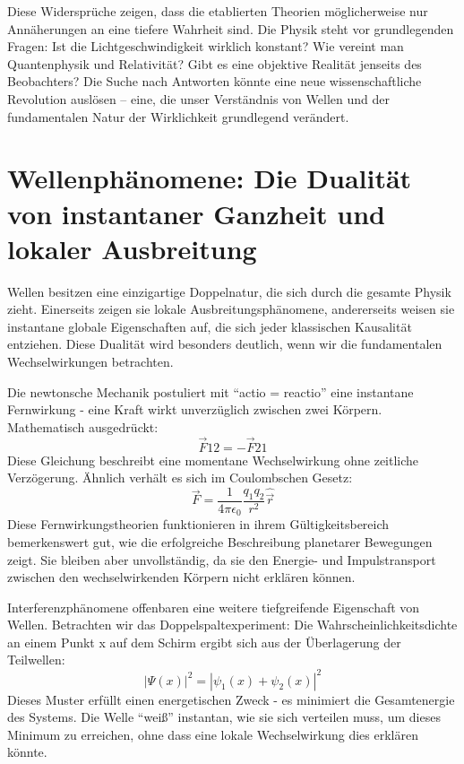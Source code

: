 Diese Widersprüche zeigen, dass die etablierten Theorien möglicherweise nur Annäherungen an eine tiefere Wahrheit sind. Die Physik steht vor grundlegenden Fragen: Ist die Lichtgeschwindigkeit
wirklich konstant? Wie vereint man Quantenphysik und Relativität? Gibt es eine objektive Realität jenseits des Beobachters? Die Suche nach Antworten könnte eine neue wissenschaftliche
Revolution auslösen – eine, die unser Verständnis von Wellen und der fundamentalen Natur der Wirklichkeit grundlegend verändert.

\section{Wellenphänomene: Die Dualität von instantaner Ganzheit und lokaler Ausbreitung}
Wellen besitzen eine einzigartige Doppelnatur, die sich durch die gesamte Physik zieht. Einerseits zeigen sie lokale Ausbreitungsphänomene, andererseits weisen sie instantane globale
Eigenschaften auf, die sich jeder klassischen Kausalität entziehen. Diese Dualität wird besonders deutlich, wenn wir die fundamentalen Wechselwirkungen betrachten.

Die newtonsche Mechanik postuliert mit \enquote{actio = reactio} eine instantane Fernwirkung - eine Kraft wirkt unverzüglich zwischen zwei Körpern. Mathematisch ausgedrückt:
\begin{equation}
    \vec{F}{12} = -\vec{F}{21}
\end{equation}
Diese Gleichung beschreibt eine momentane Wechselwirkung ohne zeitliche Verzögerung. Ähnlich verhält es sich im Coulombschen Gesetz:
\begin{equation}
    \vec{F} = \frac{1}{4\pi\epsilon_0}\frac{q_1q_2}{r^2}\hat{\vec{r}}
\end{equation}
Diese Fernwirkungstheorien funktionieren in ihrem Gültigkeitsbereich bemerkenswert gut, wie die erfolgreiche Beschreibung planetarer Bewegungen zeigt. Sie bleiben aber unvollständig,
da sie den Energie- und Impulstransport zwischen den wechselwirkenden Körpern nicht erklären können.

Interferenzphänomene offenbaren eine weitere tiefgreifende Eigenschaft von Wellen. Betrachten wir das Doppelspaltexperiment: Die Wahrscheinlichkeitsdichte an einem Punkt x auf dem
Schirm ergibt sich aus der Überlagerung der Teilwellen:
\begin{equation}
    |\Psi(x)|^2 = |\psi_1(x) + \psi_2(x)|^2
\end{equation}
Dieses Muster erfüllt einen energetischen Zweck - es minimiert die Gesamtenergie des Systems. Die Welle \enquote{weiß} instantan, wie sie sich verteilen muss, um dieses Minimum zu erreichen,
ohne dass eine lokale Wechselwirkung dies erklären könnte.

